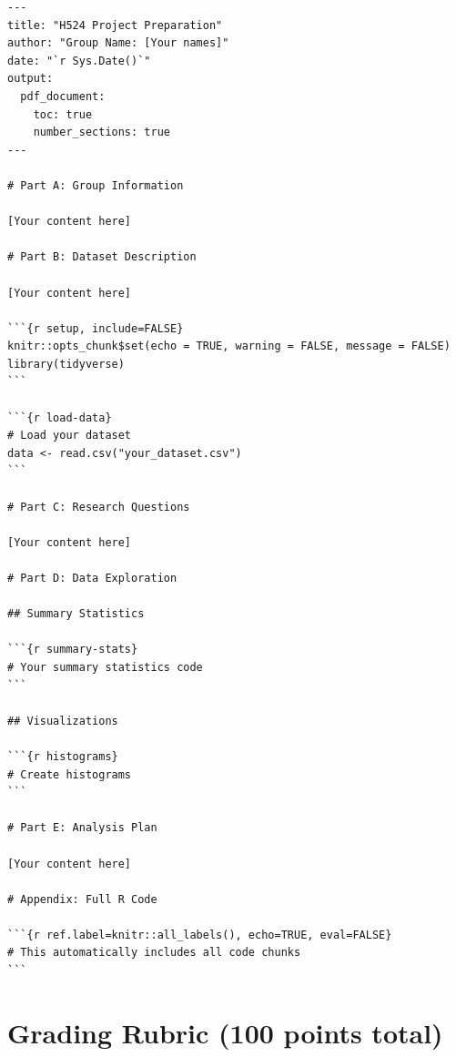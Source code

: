 \documentclass[11pt]{article}
\begin{document}
\begin{lstlisting}
---
title: "H524 Project Preparation"
author: "Group Name: [Your names]"
date: "`r Sys.Date()`"
output:
  pdf_document:
    toc: true
    number_sections: true
---

# Part A: Group Information

[Your content here]

# Part B: Dataset Description

[Your content here]

```{r setup, include=FALSE}
knitr::opts_chunk$set(echo = TRUE, warning = FALSE, message = FALSE)
library(tidyverse)
```

```{r load-data}
# Load your dataset
data <- read.csv("your_dataset.csv")
```

# Part C: Research Questions

[Your content here]

# Part D: Data Exploration

## Summary Statistics

```{r summary-stats}
# Your summary statistics code
```

## Visualizations

```{r histograms}
# Create histograms
```

# Part E: Analysis Plan

[Your content here]

# Appendix: Full R Code

```{r ref.label=knitr::all_labels(), echo=TRUE, eval=FALSE}
# This automatically includes all code chunks
```
\end{lstlisting}

\newpage

\section*{Grading Rubric (100 points total)}
\end{document}
